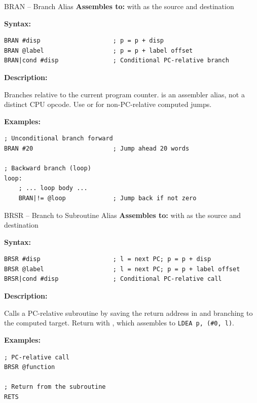 \begin{instructionbox}{BRAN -- Branch Alias}
	\textbf{Assembles to:}  with  as the source and destination

	\textbf{Syntax:}
	\begin{lstlisting}
BRAN #disp                    ; p = p + disp
BRAN @label                   ; p = p + label offset
BRAN|cond #disp               ; Conditional PC-relative branch
\end{lstlisting}

	\textbf{Description:}

	Branches relative to the current program counter.  is an assembler alias, not a distinct CPU opcode.
	Use  or  for non-PC-relative computed jumps.

	\textbf{Examples:}
	\begin{lstlisting}
; Unconditional branch forward
BRAN #20                      ; Jump ahead 20 words

; Backward branch (loop)
loop:
    ; ... loop body ...
    BRAN|!= @loop             ; Jump back if not zero
\end{lstlisting}

\end{instructionbox}

\begin{instructionbox}{BRSR -- Branch to Subroutine Alias}
	\textbf{Assembles to:}  with  as the source and destination

	\textbf{Syntax:}
	\begin{lstlisting}
BRSR #disp                    ; l = next PC; p = p + disp
BRSR @label                   ; l = next PC; p = p + label offset
BRSR|cond #disp               ; Conditional PC-relative call
\end{lstlisting}

	\textbf{Description:}

	Calls a PC-relative subroutine by saving the return address in  and branching to the computed target. Return
	with , which assembles to \texttt{LDEA p, (\#0, l)}.

	\textbf{Examples:}
	\begin{lstlisting}
; PC-relative call
BRSR @function

; Return from the subroutine
RETS
\end{lstlisting}

\end{instructionbox}

